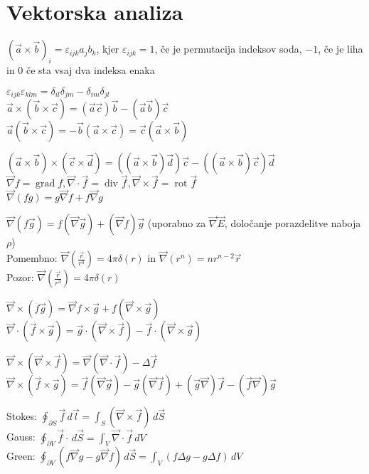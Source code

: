 \documentclass[a4paper, oneside, 12pt]{article}
\title{\mytitle}
\author{Jure Slak}
\date{\today}
\theoremstyle{definition}
\newcommand{\vv}{\vec}
\newcommand{\va}{\ensuremath{\vec{a}}}
\newcommand{\vb}{\ensuremath{\vec{b}}}
\newcommand{\vc}{\ensuremath{\vec{c}}}
\newcommand{\vf}{\ensuremath{\vec{f}}}
\newcommand{\vg}{\ensuremath{\vec{g}}}
\newcommand{\vE}{\ensuremath{\vec{E}}}
\newcommand{\vnabla}{\ensuremath{\vec{\nabla}}}
\newcommand{\eps}{\varepsilon}
\newcommand{\x}{\times}
\begin{document}
\pagestyle{empty}

\section{Vektorska analiza}
$(\va \x \vb)_i = \eps_{ijk} a_j b_k$, kjer $\eps_{ijk} = 1$, če je permutacija
indeksov soda, $-1$, če je liha in $0$ če sta vsaj dva indeksa enaka\\
\parbox{0.5\textwidth}{
$\eps_{ijk} \eps_{klm} = \delta_{il} \delta_{jm} - \delta_{im} \delta_{jl}$\\
$\va \x (\vb \x \vc) = (\va \vc) \vb - (\va \vb) \vc$\\
$\va (\vb \x \vc) = - \vb (\va \x \vc) = \vc (\va \x \vb)$}
\parbox{0.5\textwidth}{
$(\va \x \vb) \x (\vc \x \vv{d}) = ((\va \x \vb) \vv{d})\vc - ((\va \x \vb) \vc)\vv{d}$\\
$\vnabla f = \operatorname{grad} f, \vnabla \cdot \vf = \operatorname{div} \vf, \vnabla \x \vf = \operatorname{rot} \vf$ \\
$\vnabla(fg) = g \vnabla f + f \vnabla g$ }
$\vnabla(f \vg) = f (\vnabla \vg) + (\vnabla f) \vg$ (uporabno za $\vnabla \vE$, določanje porazdelitve naboja $\rho$)\\
Pomembno: $\vnabla(\frac{\vv{r}}{r^3}) = 4 \pi \delta(r)$ in $\vnabla(r^n) = n r^{n-2} \vv{r}$\\
Pozor: $\vnabla (\frac{\vv{r}}{r^3}) = 4 \pi \delta(r)$\\
\parbox{0.5\textwidth}{
$\vnabla \x (f \vg) = \vnabla f \x \vg + f (\vnabla \x \vg)$\\
$\vnabla \cdot (\vf \x \vg) = \vg \cdot (\vnabla \x \vf) - \vf \cdot (\vnabla \x \vg)$}
\parbox{0.5\textwidth}{
$\vnabla \x (\vnabla \x \vf) = \vnabla(\vnabla \cdot \vf) - \Delta \vf$\\
$\vnabla \x (\vf \x \vg) = \vf (\vnabla \vg) - \vg (\vnabla \vf) + (\vg \vnabla) \vf - (\vf \vnabla) \vg$\\ }
Stokes: $\oint_{\partial S} \vf\, d\vv{l} = \int_S (\vnabla \x \vf)\, d\vv{S}$\\
Gauss: $\oint_{\partial V} \vf \cdot\, d\vv{S} = \int_V \vnabla \cdot \vf\, dV$\\
Green: $\oint_{\partial V} (f \vnabla g - g \vnabla f)\, d\vv{S} =  \int_V (f \Delta g - g \Delta f)\, dV$
\end{document}
